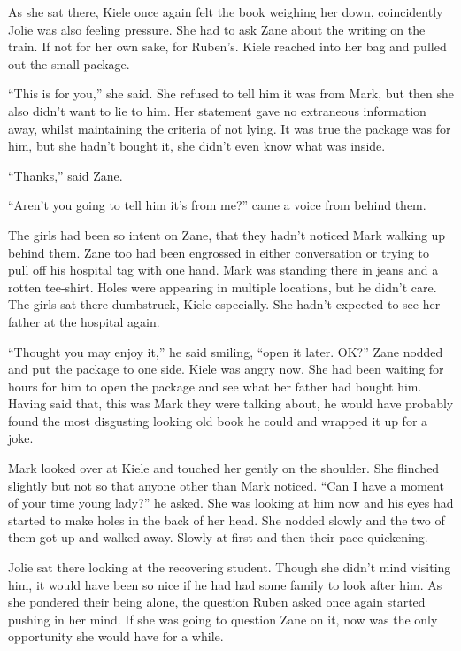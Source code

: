 As she sat there, Kiele once again felt the book weighing her down, coincidently Jolie was also feeling pressure.  She had to ask Zane about the writing on the train.  If not for her own sake, for Ruben's.  Kiele reached into her bag and pulled out the small package.  

``This is for you,'' she said.  She refused to tell him it was from Mark, but then she also didn't want to lie to him.  Her statement gave no extraneous information away, whilst maintaining the criteria of not lying.  It was true the package was for him, but she hadn't bought it, she didn't even know what was inside.

``Thanks,'' said Zane.  

``Aren't you going to tell him it's from me?'' came a voice from behind them.  

The girls had been so intent on Zane, that they hadn't noticed Mark walking up behind them.  Zane too had been engrossed in either conversation or trying to pull off his hospital tag with one hand.  Mark was standing there in jeans and a rotten tee-shirt.  Holes were appearing in multiple locations, but he didn't care.  The girls sat there dumbstruck, Kiele especially.  She hadn't expected to see her father at the hospital again.  

``Thought you may enjoy it,'' he said smiling, ``open it later.  OK?''  Zane nodded and put the package to one side.  Kiele was angry now.  She had been waiting for hours for him to open the package and see what her father had bought him.  Having said that, this was Mark they were talking about, he would have probably found the most disgusting looking old book he could and wrapped it up for a joke.

Mark looked over at Kiele and touched her gently on the shoulder.  She flinched slightly but not so that anyone other than Mark noticed.  ``Can I have a moment of your time young lady?'' he asked.  She was looking at him now and his eyes had started to make holes in the back of her head.  She nodded slowly and the two of them got up and walked away.  Slowly at first and then their pace quickening.

Jolie sat there looking at the recovering student.  Though she didn't mind visiting him, it would have been so nice if he had had some family to look after him.  As she pondered their being alone, the question Ruben asked once again started pushing in her mind.  If she was going to question Zane on it, now was the only opportunity she would have for a while.

